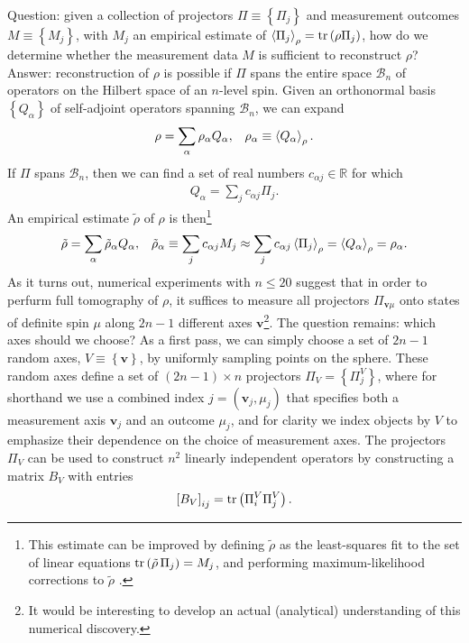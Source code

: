 \documentclass[nofootinbib,notitlepage,11pt]{revtex4-2}
\newcommand{\p}[1]{\left(#1\right)} %
\renewcommand{\sp}[1]{\left[#1\right]} %
\renewcommand{\set}[1]{\left\{#1\right\}} %
\newcommand{\bk}{\Braket} %
\renewcommand{\v}{\bm} %
\newcommand{\1}{\mathds{1}}
\newcommand{\B}{\mathcal{B}}
\newcommand{\RR}{\mathbb{R}}
\begin{document}
Question: given a collection of projectors $\Pi\equiv\set{\Pi_j}$ and measurement outcomes $M\equiv\set{M_j}$, with $M_j$ an empirical estimate of $\bk{\Pi_j}_\rho=\tr\p{\rho\Pi_j}$, how do we determine whether the measurement data $M$ is sufficient to reconstruct $\rho$?
Answer: reconstruction of $\rho$ is possible if $\Pi$ spans the entire space $\B_n$ of operators on the Hilbert space of an $n$-level spin.
Given an orthonormal basis $\set{Q_\alpha}$ of self-adjoint operators spanning $\B_n$, we can expand
\begin{align}
  \rho = \sum_\alpha \rho_\alpha Q_\alpha,
  &&
  \rho_\alpha \equiv \bk{Q_\alpha}_\rho.
\end{align}
If $\Pi$ spans $\B_n$, then we can find a set of real numbers $c_{\alpha j}\in\RR$ for which
\begin{align}
  Q_\alpha = \sum_j c_{\alpha j} \Pi_j.
\end{align}
An empirical estimate $\tilde\rho$ of $\rho$ is then\footnote{This estimate can be improved by defining $\tilde\rho$ as the least-squares fit to the set of linear equations $\tr\p{\tilde\rho\,\Pi_j} = M_j$, and performing maximum-likelihood corrections to $\tilde\rho$ \cite{smolin2012efficient}.}
\begin{align}
  \tilde\rho = \sum_\alpha \tilde\rho_\alpha Q_\alpha,
  &&
  \tilde\rho_\alpha \equiv \sum_j c_{\alpha j} M_j
  \approx \sum_j c_{\alpha j} \bk{\Pi_j}_\rho
  = \bk{Q_\alpha}_\rho
  = \rho_\alpha.
\end{align}
As it turns out, numerical experiments with $n\le20$ suggest that in order to perfurm full tomography of $\rho$, it suffices to measure all projectors $\Pi_{\v v\mu}$ onto states of definite spin $\mu$ along $2n-1$ different axes $\v v$\footnote{It would be interesting to develop an actual (analytical) understanding of this numerical discovery.}.
The question remains: which axes should we choose?
As a first pass, we can simply choose a set of $2n-1$ random axes, $V\equiv\set{\v v}$, by uniformly sampling points on the sphere.
These random axes define a set of $\p{2n-1}\times n$ projectors $\Pi_V=\set{\Pi^V_j}$, where for shorthand we use a combined index $j=\p{\v v_j,\mu_j}$ that specifies both a measurement axis $\v v_j$ and an outcome $\mu_j$, and for clarity we index objects by $V$ to emphasize their dependence on the choice of measurement axes.
The projectors $\Pi_V$ can be used to construct $n^2$ linearly independent operators by constructing a matrix $B_V$ with entries
\begin{align}
  \sp{B_V}_{ij} = \tr\p{\Pi^V_i \Pi^V_j}.
\end{align}
\end{document}
